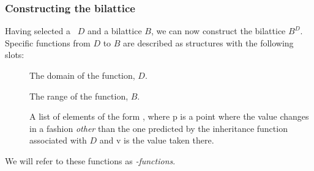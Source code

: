 \subsubsection{Constructing the bilattice}

Having selected a \dg\ $D$ and a bilattice $B$, we can now construct
the bilattice $B^D$.  Specific functions from $D$ to $B$ are described
as structures with the following slots:
 \begin{description}
 \item [] The domain of the function, $D$.
 \item [] The range of the function, $B$.
 \item [] A list of elements of the form ,
where \type p is a point where the value changes in a fashion {\em
other\/} than the one predicted by the inheritance function associated
with $D$ and \type v is the value taken there.
 \end{description}
 We will refer to these functions as {\em \dg-functions}.

